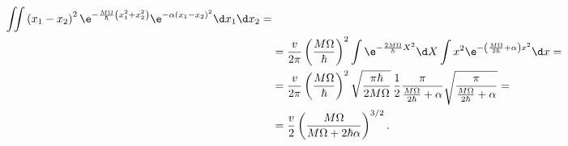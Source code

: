 \begin{solution}
\begin{align}
				\iint\left(x_{1}-x_{2}\right)^{2}\e^{-\frac{M\Omega}{\hbar}\left(x_{1}^{2}+x_{2}^{2}\right)}
				\e^{-\alpha\left(x_{1}-x_{2}\right)^{2}}\d x_{1}\d x_{2}=\nonumber\\
			&=\frac{v}{2\pi}\left(\frac{M\Omega}{\hbar}\right)^{2}
				\int\e^{-\frac{2M\Omega}{\hbar}X^{2}}\d X
				\int x^{2}\e^{-\left(\frac{M\Omega}{2\hbar}+\alpha\right)x^{2}}\d x=\nonumber\\
			&=\frac{v}{2\pi}\left(\frac{M\Omega}{\hbar}\right)^{2}
				\sqrt{\frac{\pi\hbar}{2M\Omega}}\,
				\frac{1}{2}\frac{\pi}{\frac{M\Omega}{2\hbar}+\alpha}
				\sqrt{\frac{\pi}{\frac{M\Omega}{2\hbar}+\alpha}}=\nonumber\\
			&=\frac{v}{2}\left(\frac{M\Omega}{M\Omega+2\hbar\alpha}\right)^{3/2}.
	\end{align}
\end{solution}
